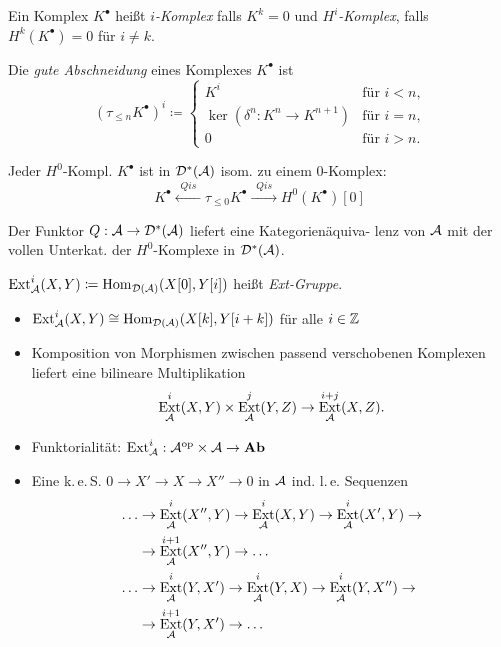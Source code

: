 \documentclass{cheat-sheet}
\newcommand{\CCC}[1]{{#1}^{\bullet}} %
\DeclareMathOperator{\Ext}{Ext} %
\begin{document}
\begin{defn}
  Ein Komplex $\CCC{K}$ heißt \emph{$i$-Komplex} falls $K^k = 0$ und \emph{$H^i$-Komplex}, falls $H^k(\CCC{K}) = 0$ für $i \neq k$.
\end{defn}

\begin{defn}
  Die \emph{gute Abschneidung} eines Komplexes $\CCC{K}$ ist
  \[
    (\tau_{\leq n} \CCC{K})^i \coloneqq \begin{cases}
      K^i & \text{für $i < n$,} \\
      \ker(\delta^n : K^n \to K^{n+1}) & \text{für $i = n$,} \\
      0 & \text{für $i > n$.}
    \end{cases}
  \]
\end{defn}

\begin{bem}
  Jeder $H^0$-Kompl. $\CCC{K}$ ist in $\mathcal{D}^*(\mathcal{A})$ isom. zu einem $0$-Komplex:
  \[ \CCC{K} \xleftarrow{\enspace Qis \enspace} \tau_{\leq 0} \CCC{K} \xrightarrow{\enspace Qis \enspace} H^0(\CCC{K})[0] \]
\end{bem}

\begin{prop}
  Der Funktor $Q : \mathcal{A} \to \mathcal{D}^*(\mathcal{A})$ liefert eine Kategorienäquiva- lenz von $\mathcal{A}$ mit der vollen Unterkat. der $H^0$-Komplexe in $\mathcal{D}^*(\mathcal{A})$.
\end{prop}

\begin{defn}
  $\Ext^i_\Aat(X, Y) \coloneqq \Hom_{\Der(\Aat)}(X[0], Y[i])$ heißt \emph{Ext-Gruppe}.
\end{defn}

\begin{bem}
  \begin{itemize}
    \item $\Ext^i_\Aat(X, Y) \cong \Hom_{\Der(\Aat)}(X[k], Y[i+k])$ für alle $i \in \mathbb{Z}$
    \item Komposition von Morphismen zwischen passend verschobenen Komplexen liefert eine bilineare Multiplikation
    \[ \Ext^i_\Aat(X, Y) \times \Ext^j_\Aat(Y, Z) \to \Ext^{i+j}_\Aat(X, Z). \]
    \item Funktorialität: $\Ext^i_\Aat : \Aat^\op \times \Aat \to \AbGrp$
    \item Eine k.\,e.\,S. $0 \to X' \to X \to X'' \to 0$ in $\mathcal{A}$ ind. l.\,e. Sequenzen
    \begin{align*}
      \ldots & \to \Ext^i_\Aat(X'', Y) \to \Ext^i_\Aat(X,Y) \to \Ext^i_\Aat(X', Y) \to \\
      & \to \Ext^{i+1}_\Aat(X'', Y) \to \ldots \\
      \ldots & \to \Ext^i_\Aat(Y, X') \to \Ext^i_\Aat(Y, X) \to \Ext^i_\Aat(Y, X'') \to \\
      & \to \Ext^{i+1}_\Aat(Y, X') \to \ldots
    \end{align*}
  \end{itemize}
\end{bem}
\end{document}

